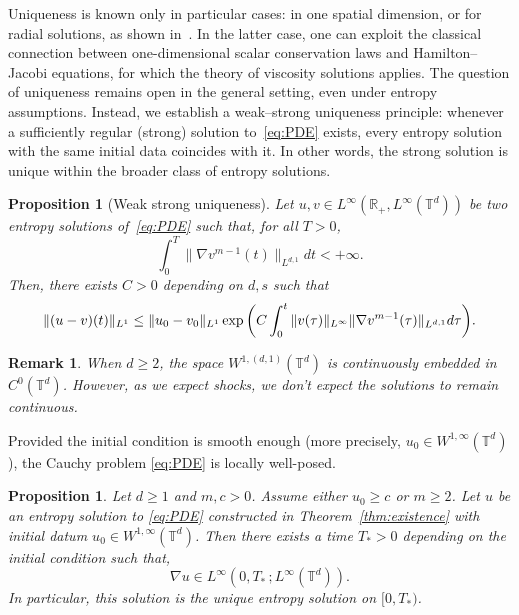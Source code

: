 \documentclass[11pt]{article}
\newtheorem{prop}[thm]{Proposition}
\newtheorem{remark}[thm]{Remark}
\numberwithin{equation}{section} %
\newcommand{\R}{{\mathbb{R}}}
\newcommand{\T}{{\mathbb{T}}}
\def\nab{\nabla}
\begin{document}
Uniqueness is known only in particular cases: in one spatial dimension, or for radial solutions, as shown in~\cite{CGV2022vortex, CGV22FastRegularisation}. In the latter case, one can exploit the classical connection between one-dimensional scalar conservation laws and Hamilton–Jacobi equations, for which the theory of viscosity solutions applies. The question of uniqueness remains open in the general setting, even under entropy assumptions. Instead, we establish a weak–strong uniqueness principle: whenever a sufficiently regular (strong) solution to~\eqref{eq:PDE} exists, every entropy solution with the same initial data coincides with it. In other words, the strong solution is unique within the broader class of entropy solutions.


\begin{prop}[Weak strong uniqueness]\label{thm:weak_strong_uniqueness}
Let $u,v\in L^\infty(\R_+, L^\infty(\T^d))$ be two entropy solutions of~\eqref{eq:PDE} such that, for all $T>0$,
\begin{equation}\label{eq:est_weak_strong}
    \displaystyle \int_0^T \| \nab v^{m-1}(t)\|_{L^{d,1}}dt <+\infty.
\end{equation}
Then, there exists $C>0$ depending on $d,s$ such that
\begin{equation*}
    \| (u-v)(t)\|_{L^1} \\
    \le \| u_0-v_0\|_{L^1} \exp\bigg( C\int_0^t \|v(\tau) \|_{L^\infty} 
    \| \nab v^{m-1}(\tau)\|_{L^{d,1}}  d\tau \bigg).
\end{equation*}
\end{prop}


\begin{remark}
When $d\ge 2$, the space $W^{1,(d,1)}(\T^d)$ is continuously embedded in $C^0(\T^d)$. However, as we expect shocks, we don't expect the solutions to remain continuous. 
\end{remark}




Provided the initial condition is smooth enough (more precisely, $u_{0}\in W^{1,\infty}(\T^d)$), the Cauchy problem \eqref{eq:PDE} is locally well-posed.

\begin{prop}\label{prop:strong_solution}Let $d\ge 1$ and $m,c>0$. Assume either $u_{0}\ge c$ or $m\ge2$. Let $u$ be an entropy solution to \eqref{eq:PDE} constructed in Theorem~\ref{thm:existence} with initial datum $u_{0}\in W^{1,\infty}(\T^d)$. Then there exists a time $T_* >0$ depending on the initial condition 
such that, 
$$
\nabla u \in L^{\infty}(0,T_*\, ; L^{\infty}(\T^d)).
$$
In particular, this solution is the unique entropy solution on $[0,T_*)$.
\end{prop}
\end{document}
